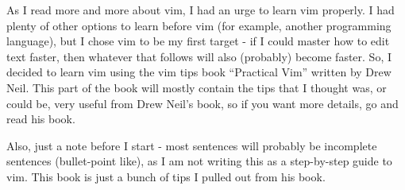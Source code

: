 As I read more and more about vim, I had an urge to learn vim properly.
I had plenty of other options to learn before vim (for example, another programming language), but I chose vim to be my first target - if I could master how to edit text faster, then whatever that follows will also (probably) become faster.
So, I decided to learn vim using the vim tips book ``Practical Vim'' written by Drew Neil.
This part of the book will mostly contain the tips that I thought was, or could be, very useful from Drew Neil's book, so if you want more details, go and read his book.

Also, just a note before I start - most sentences will probably be incomplete sentences (bullet-point like), as I am not writing this as a step-by-step guide to vim.
This book is just a bunch of tips I pulled out from his book.
